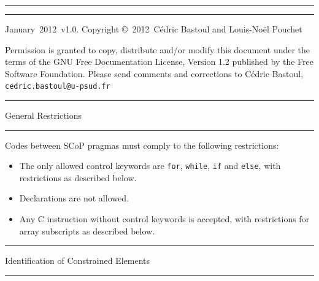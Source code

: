 \documentclass[landscape,a4paper]{article}
\def\versionnumber{1.0}
\def\year{2012}
\def\month{January}
\def\version{\month\ \year\ v\versionnumber}
\def\titre#1{\begin{center}\hrule\vspace{0.1cm}#1
\vspace{0.07cm}\hrule\end{center}}
\begin{document}
\begin{multicols}{3}
\hrule
\vspace{0.1cm}
\hrule
\begin{scriptsize}
\vspace{0.1cm}
\centerline{\version. Copyright \copyright\ \year\ C\'edric Bastoul and Louis-No\"el Pouchet}

Permission is granted to copy, distribute and/or modify this
document under the terms of the GNU Free Documentation License,
Version 1.2 published by the Free Software Foundation.
Please send comments and corrections to C\'edric Bastoul, \verb+cedric.bastoul@u-psud.fr+

\end{scriptsize}

\titre{General Restrictions\vspace{0.07cm}}

\begin{small}
Codes between SCoP pragmas must comply to the following restrictions:
\begin{itemize}
\item The only allowed control keywords are {\tt for}, {\tt while}, {\tt if} and
      {\tt else}, with restrictions as described below.
\item Declarations are not allowed.
\item Any C instruction without control keywords is accepted, with
      restrictions for array subscripts as described below.
\end{itemize}
\end{small}

\titre{Identification of Constrained Elements\vspace{0.07cm}}

\begin{center}
\end{center}
\end{multicols}
\end{document}
